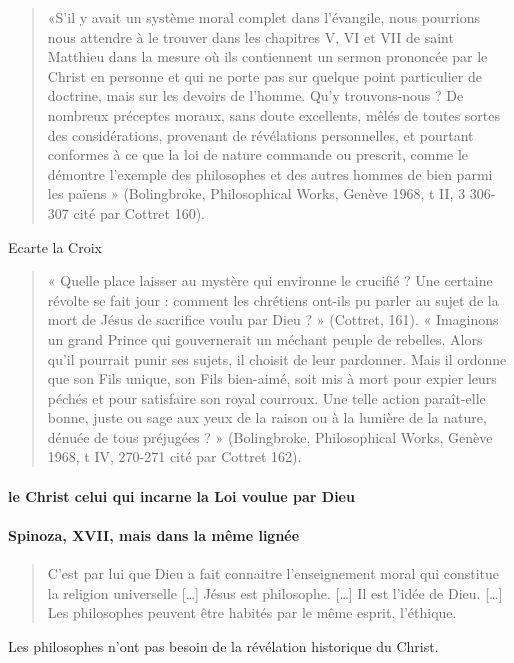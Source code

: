 \begin{quote}
«S’il y avait un système moral complet dans l’évangile, nous pourrions nous attendre à le
trouver dans les chapitres V, VI et VII de saint Matthieu  dans la mesure où ils contiennent un
sermon prononcée par le Christ en personne et qui ne porte pas sur quelque point particulier
de doctrine, mais sur les devoirs de l’homme. Qu’y trouvons-nous ? De nombreux préceptes
moraux, sans doute excellents, mêlés de toutes sortes des considérations, provenant de
révélations personnelles, et pourtant conformes à ce que la loi de nature commande ou
prescrit, comme le démontre l’exemple des philosophes et des autres hommes de bien parmi
les païens » (Bolingbroke, Philosophical Works, Genève 1968, t II, 3 306-307 cité par Cottret
160).
    
\end{quote}
Ecarte la Croix 
\begin{quote}
« Quelle place laisser au mystère qui environne le crucifié ? Une certaine révolte se fait jour :
comment les chrétiens ont-ils pu parler au sujet de la mort de Jésus de sacrifice voulu par
Dieu ? » (Cottret, 161). « Imaginons un grand Prince qui gouvernerait un méchant peuple de
rebelles. Alors qu’il pourrait punir ses sujets, il choisit de leur pardonner. Mais il ordonne que
son Fils unique, son Fils bien-aimé, soit mis à mort pour expier leurs péchés et pour satisfaire
son royal courroux. Une telle action paraît-elle bonne, juste ou sage aux yeux de la raison ou à
la lumière de la nature, dénuée de tous préjugées ? » (Bolingbroke, Philosophical Works,
Genève 1968, t IV, 270-271 cité par Cottret 162).
    
\end{quote}


\paragraph{le Christ celui qui incarne la Loi voulue par Dieu}


\paragraph{Spinoza, XVII, mais dans la même lignée}

\begin{quote}
    C'est par lui que Dieu a fait connaitre l'enseignement moral qui constitue la religion universelle [\ldots] Jésus est philosophe. [\ldots] Il est l'idée de Dieu. [\ldots] Les philosophes peuvent être habités par le même esprit, l'éthique.
\end{quote}
Les philosophes n'ont pas besoin de la révélation historique du Christ. 

